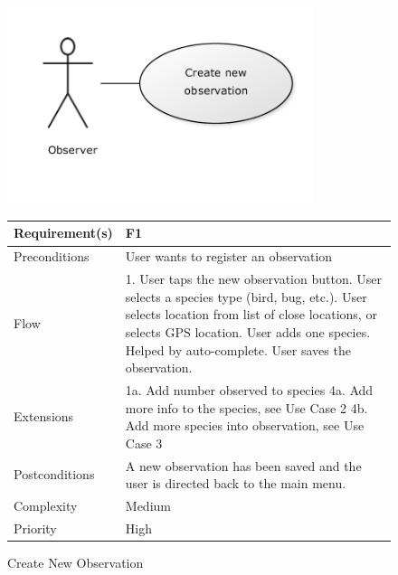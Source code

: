 \begin{figure}
		\centering
		\includegraphics[width=0.8\textwidth]{reqspec/uc/cno.png}
		\caption{Create New Observation}
		\label{fig:cno}

\begin{tabular}{|l|p{}|}\hline
	Requirement(s)&F1\\\hline
	Preconditions&User wants to register an observation\\\hline
	Flow&1. User taps the new observation button\newline
	2. User selects a species type (bird, bug, etc.)\newline
	3. User selects location from list of close locations, or selects GPS location\newline
	4. User adds one species. Helped by auto-complete\newline
	5. User saves the observation.\\\hline
	Extensions& 1a. Add number observed to species\newline
	4a. Add more info to the species, see Use Case 2\newline
	4b. Add more species into observation, see Use Case 3\\\hline
	Postconditions&A new observation has been saved and the user is directed back to the main menu.\\\hline
	Complexity&Medium\\\hline
	Priority&High\\\hline
\end{tabular}
\end{figure}

\hspace{2em}


